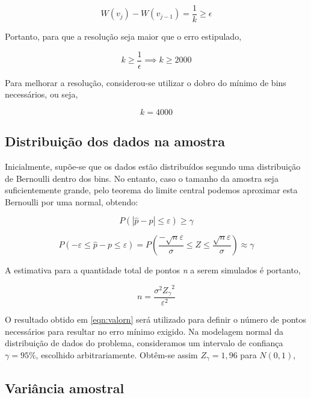 \documentclass{article}
\begin{document}
\begin{equation}
    W(v_j) - W(v_{j-1}) = \frac{1}{k} \geq \epsilon
    \label{eqn:valork}
\end{equation}

Portanto, para que a resolução seja maior que o erro estipulado, 

\begin{equation}
    k \geq \frac{1}{\epsilon} \implies k \geq 2000
    \label{eqn:valork}
\end{equation}

Para melhorar a resolução, considerou-se utilizar o dobro do mínimo de bins necessários, ou seja,

\begin{equation*}
    k = 4000
\end{equation*}

\subsection{Distribuição dos dados na amostra}

\indent Inicialmente, supõe-se que os dados estão distribuídos segundo uma distribuição de Bernoulli dentro dos bins. No entanto, caso o tamanho da amostra seja suficientemente grande, pelo teorema do limite central podemos aproximar esta Bernoulli por uma normal, obtendo:

\[
P(|\hat{p} - p|\leq \varepsilon)\geq \gamma 
\] \cite{estatbas}

\[
P(-\varepsilon \leq \hat{p} - p \leq \varepsilon) = P\left( \frac{-\sqrt{n}\varepsilon}{\sigma} \leq Z \leq \frac{\sqrt{n}\varepsilon}{\sigma}\right) \approx \gamma
\]

\indent A estimativa para a quantidade total de pontos \textit{n} a serem simulados é portanto,

\begin{equation}
    n = \frac {\sigma^2 {Z_\gamma}^2} {\varepsilon^2}
    \label{eqn:valorn}
\end{equation}

\indent O resultado obtido em \ref{eqn:valorn} será utilizado para definir o número de pontos necessários para resultar no erro mínimo exigido. Na modelagem normal da distribuição de dados do problema, consideramos um intervalo de confiança $\gamma = 95\%$, escolhido arbitrariamente. Obtêm-se assim $Z_\gamma = 1,96$ para $N(0,1)$,

\subsection{Variância amostral}
\end{document}
